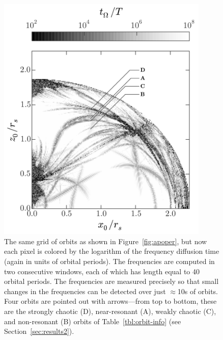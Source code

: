 \documentclass[letterpaper,12pt,preprint]{aastex}
\begin{document}
\begin{figure}[p]
\begin{center}
\includegraphics[width=0.9\textwidth, trim={0 0 0 0}]{figures/fdiff_map.pdf}
\caption{The same grid of orbits as shown in Figure~\ref{fig:apoper}, but now each pixel is colored by the logarithm of the frequency diffusion time (again in units of orbital periods). The frequencies are computed in two consecutive windows, each of which has length equal to 40 orbital periods. The frequencies are measured precisely so that small changes in the frequencies can be detected over just $\approx$10s of orbits. Four orbits are pointed out with arrows---from top to bottom, these are the strongly chaotic (D), near-resonant (A), weakly chaotic (C), and non-resonant (B) orbits of Table~\ref{tbl:orbit-info} (see Section~\ref{sec:results2}).} \label{fig:freqdiff}
\end{center}
\end{figure}
\end{document}
